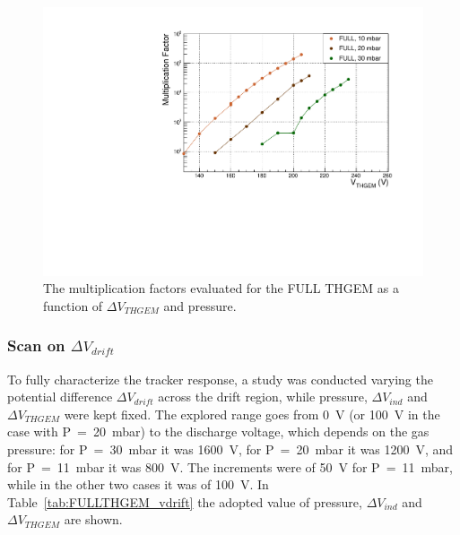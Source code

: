 \documentclass[a4paper, 11 pt]{article}
\newcommand{\Vind}{$\Delta V_{ind}$}
\newcommand{\Vthgem}{$\Delta V_{THGEM}$}
\newcommand{\Vdrift}{$ \Delta V_{drift}$}
\begin{document}
\begin{figure}[!t]
	\centering
	\includegraphics[width=\textwidth]{Immagini/MFvsTHGEM_FULL.pdf}
	\caption{The multiplication factors evaluated for the FULL THGEM as a function of \Vthgem{} and pressure.}
	\label{fig:multiplication_factor_FULL}
\end{figure}


\clearpage

\subsubsection{Scan on \Vdrift}

To fully characterize the tracker response, a study was conducted varying the potential difference \Vdrift{} across the drift region, while pressure, \Vind{} and \Vthgem{} were kept fixed.
The explored range goes from 0~V (or 100~V in the case with P~=~20~mbar) to the discharge voltage, which depends on the gas pressure: for P~=~30~mbar it was 1600~V, for P~=~20~mbar it was 1200~V, and for P~=~11~mbar it was 800~V.
The increments were of 50~V for P~=~11~mbar, while in the other two cases it was of 100~V.
In Table~\ref{tab:FULLTHGEM_vdrift} the adopted value of pressure, \Vind{} and \Vthgem{} are shown.
\end{document}
